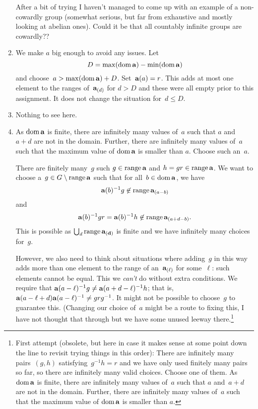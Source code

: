 \documentclass[a4paper,12pt]{article}
\newcommand{\dom}{\mathop{\rm dom}\nolimits}
\newcommand{\range}{\mathop{\rm range}\nolimits}
\begin{document}
\begin{enumerate}
After a bit of trying I haven't managed to come up with an example of a non-cowardly group (somewhat serious, but far from exhaustive and mostly looking at abelian ones).  Could it be that all countably infinite groups are cowardly??



\item  We make $a$ big enough to avoid any issues.  Let $$D = \max(\dom{{\bf a}}) - \min(\dom{{\bf a}})$$ and choose~$a > \max(\dom{{\bf a}}) + D$.  Set~${\bf a}(a) = r$.  This adds at most one element to the ranges of~${\bf a}_{(d)}$ for $d > D$ and these were all empty prior to this assignment.  It does not change the situation for~$d \leq D$.

\item  Nothing to see here.

\item As $\dom{{\bf a}}$ is finite, there are infinitely many values of~$a$ such that $a$ and~$a+d$ are not in the domain.   Further, there are infinitely many values of~$a$ such that the maximum value of $\dom{{\bf a}}$  is smaller than $a$.  Choose such an~$a$.  

There are finitely many~$g$ such $g \in \range{{\bf a}}$ and $h = gr \in  \range{{\bf a}}$.  We want to choose a~$g \in G \setminus \range{{\bf a}}$ such that for all~$b \in \dom{{\bf a}}$, we have $${\bf a}(b)^{-1}g \not\in \range{{\bf a}_{(a-b)}}$$ and $$  {\bf a}(b)^{-1}gr =  {\bf a}(b)^{-1}h \not\in \range{{\bf a}_{(a+d-b)}}.$$
This is possible as $\bigcup_{d} \range{{\bf a_{(d)}}}$ is finite and we have infinitely many choices for~$g$.

However, we also need to think about situations where adding~$g$ in this way adds more than one element to the range of an~${\bf a}_{(\ell)}$ for some~$\ell$: such elements cannot be equal.  This we {\em can't} do without extra conditions.  We require that ${\bf a}(a-\ell)^{-1}g \neq {\bf a}(a+d-\ell)^{-1}h$; that is, ${\bf a}(a-\ell+d){\bf a}(a-\ell)^{-1} \neq grg^{-1}$.  It might not be possible to choose~$g$ to guarantee this.  (Changing our choice of~$a$ might be a route to fixing this, I have not thought that through but we have some unused leeway there.\footnote{First attempt (obsolete, but here in case it makes sense at some point down the line to revisit trying things in this order): There are infinitely many pairs~$(g,h)$ satisfying~$g^{-1}h = r$ and we have only used finitely many pairs so far, so there are infinitely many valid choices.  Choose one of them.  As $\dom{{\bf a}}$ is finite, there are infinitely many values of~$a$ such that $a$ and~$a+d$ are not in the domain.   Further, there are infinitely many values of~$a$ such that the maximum value of $\dom{{\bf a}}$  is smaller than $a$.

}
\end{enumerate}
\end{document}
